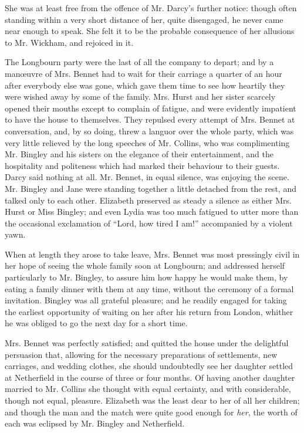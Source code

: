 \documentclass[12pt,openright]{book}
\begin{document}
She was at least free from the offence of Mr. Darcy’s further notice: though often standing within a very short distance of her, quite disengaged, he never came near enough to speak. She felt it to be the probable consequence of her allusions to Mr. Wickham, and rejoiced in it.

The Longbourn party were the last of all the company to depart; and by a manœuvre of Mrs. Bennet had to wait for their carriage a quarter of an hour after everybody else was gone, which gave them time to see how heartily they were wished away by some of the family. Mrs. Hurst and her sister scarcely opened their mouths except to complain of fatigue, and were evidently impatient to have the house to themselves. They repulsed every attempt of Mrs. Bennet at conversation, and, by so doing, threw a languor over the whole party, which was very little relieved by the long speeches of Mr. Collins, who was complimenting Mr. Bingley and his sisters on the elegance of their entertainment, and the hospitality and politeness which had marked their behaviour to their guests. Darcy said nothing at all. Mr. Bennet, in equal silence, was enjoying the scene. Mr. Bingley and Jane were standing together a little detached from the rest, and talked only to each other. Elizabeth preserved as steady a silence as either Mrs. Hurst or Miss Bingley; and even Lydia was too much fatigued to utter more than the occasional exclamation of “Lord, how tired I am!” accompanied by a violent yawn.

When at length they arose to take leave, Mrs. Bennet was most pressingly civil in her hope of seeing the whole family soon at Longbourn; and addressed herself particularly to Mr. Bingley, to assure him how happy he would make them, by eating a family dinner with them at any time, without the ceremony of a formal invitation. Bingley was all grateful pleasure; and he readily engaged for taking the earliest opportunity of waiting on her after his return from London, whither he was obliged to go the next day for a short time.

Mrs. Bennet was perfectly satisfied; and quitted the house under the delightful persuasion that, allowing for the necessary preparations of settlements, new carriages, and wedding clothes, she should undoubtedly see her daughter settled at Netherfield in the course of three or four months. Of having another daughter married to Mr. Collins she thought with equal certainty, and with considerable, though not equal, pleasure. Elizabeth was the least dear to her of all her children; and though the man and the match were quite good enough for \textit{her}, the worth of each was eclipsed by Mr. Bingley and Netherfield.
\end{document}
